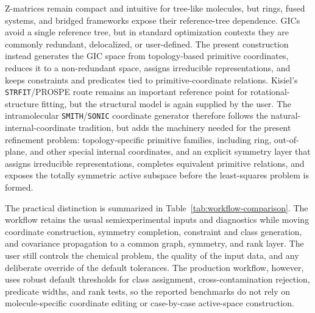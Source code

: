 \documentclass[aip,jcp,reprint,longbibliography,floatfix]{revtex4-2}
\begin{document}
Z-matrices remain compact and intuitive for tree-like molecules, but rings,
fused systems, and bridged frameworks expose their reference-tree
dependence.\cite{BakerHehre1991ZMatrix} GICs avoid a single reference tree, but
in standard optimization contexts they are commonly redundant, delocalized, or
user-defined. The present construction instead generates the GIC space from
topology-based primitive coordinates, reduces it to a non-redundant space,
assigns irreducible representations, and keeps constraints and predicates tied
to primitive-coordinate relations. Kisiel's \texttt{STRFIT}/PROSPE
route\cite{KisielPROSPE} remains an important reference point for
rotational-structure fitting, but the structural model is again supplied by
the user.\cite{Kanzow2025PCCP}
The intramolecular \texttt{SMITH}/\texttt{SONIC} coordinate generator therefore follows the
natural-internal-coordinate
tradition, but adds the machinery needed for the present refinement problem:
topology-specific primitive families, including ring, out-of-plane, and other
special internal coordinates, and an explicit symmetry layer that assigns
irreducible representations, completes equivalent primitive relations, and
exposes the totally symmetric active subspace before the least-squares problem
is formed.

The practical distinction is summarized in Table~\ref{tab:workflow-comparison}.
The workflow retains the usual semiexperimental inputs and diagnostics while
moving coordinate construction, symmetry completion, constraint and class
generation, and covariance propagation to a common graph, symmetry, and rank
layer. The user still controls the chemical problem, the quality of the input
data, and any deliberate override of the default tolerances. The production
workflow, however, uses robust default thresholds for class assignment,
cross-contamination rejection, predicate widths, and rank tests, so the
reported benchmarks do not rely on molecule-specific coordinate editing or
case-by-case active-space construction.
\end{document}
